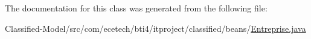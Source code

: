The documentation for this class was generated from the following file\+:\begin{DoxyCompactItemize}
\item 
Classified-\/\+Model/src/com/ecetech/bti4/itproject/classified/beans/\hyperlink{_entreprise_8java}{Entreprise.\+java}\end{DoxyCompactItemize}
